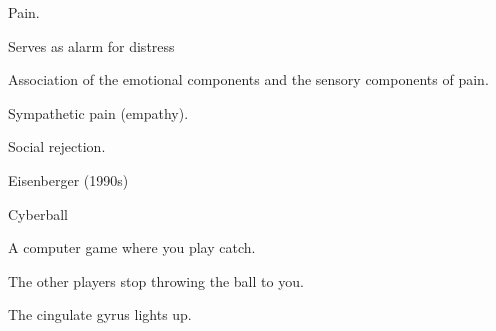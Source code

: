\begin{coloredlist}
\begin{coloredlist}
\begin{coloredlist}
            \item Pain.
            \begin{coloredlist}
                \item Serves as alarm for distress
                \item Association of the emotional components and the sensory components of pain.
                \item Sympathetic pain (empathy).
                \item Social rejection.
                \begin{coloredlist}
                    \item Eisenberger (1990s)
                    \item Cyberball
                    \begin{coloredlist}
                        \item A computer game where you play catch.
                        \item The other players stop throwing the ball to you.
                        \item The cingulate gyrus lights up.
                    \end{coloredlist}
                \end{coloredlist}
            \end{coloredlist}
        \end{coloredlist}
        \item {}
        \item {}
        \item {}
    \end{coloredlist}
\end{coloredlist}
